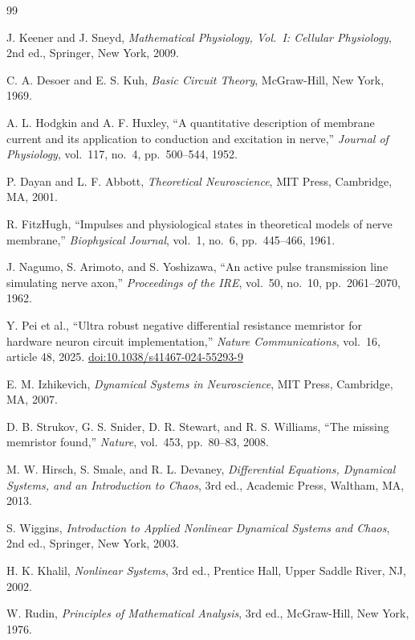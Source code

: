\documentclass[11pt]{article}
\begin{document}
\begin{thebibliography}{99}

J. Keener and J. Sneyd,
\emph{Mathematical Physiology, Vol.~I: Cellular Physiology},
2nd ed., Springer, New York, 2009.

C. A. Desoer and E. S. Kuh,
\emph{Basic Circuit Theory},
McGraw-Hill, New York, 1969.

A. L. Hodgkin and A. F. Huxley,
``A quantitative description of membrane current and its application to
conduction and excitation in nerve,''
\emph{Journal of Physiology}, vol.~117, no.~4, pp.~500--544, 1952.

P. Dayan and L. F. Abbott,
\emph{Theoretical Neuroscience},
MIT Press, Cambridge, MA, 2001.

R. FitzHugh,
``Impulses and physiological states in theoretical models of nerve membrane,''
\emph{Biophysical Journal}, vol.~1, no.~6, pp.~445--466, 1961.

J. Nagumo, S. Arimoto, and S. Yoshizawa,
``An active pulse transmission line simulating nerve axon,''
\emph{Proceedings of the IRE}, vol.~50, no.~10, pp.~2061--2070, 1962.

Y. Pei et al.,
``Ultra robust negative differential resistance memristor for hardware
neuron circuit implementation,''
\emph{Nature Communications}, vol.~16, article 48, 2025.
\href{https://doi.org/10.1038/s41467-024-55293-9}{doi:10.1038/s41467-024-55293-9}

E. M. Izhikevich,
\emph{Dynamical Systems in Neuroscience},
MIT Press, Cambridge, MA, 2007.

D. B. Strukov, G. S. Snider, D. R. Stewart, and R. S. Williams,
``The missing memristor found,''
\emph{Nature}, vol.~453, pp.~80--83, 2008.

M. W. Hirsch, S. Smale, and R. L. Devaney,
\emph{Differential Equations, Dynamical Systems, and an Introduction to Chaos},
3rd ed., Academic Press, Waltham, MA, 2013.

S. Wiggins,
\emph{Introduction to Applied Nonlinear Dynamical Systems and Chaos},
2nd ed., Springer, New York, 2003.

H. K. Khalil,
\emph{Nonlinear Systems},
3rd ed., Prentice Hall, Upper Saddle River, NJ, 2002.

W. Rudin,
\emph{Principles of Mathematical Analysis},
3rd ed., McGraw-Hill, New York, 1976.


\end{thebibliography}
\end{document}
